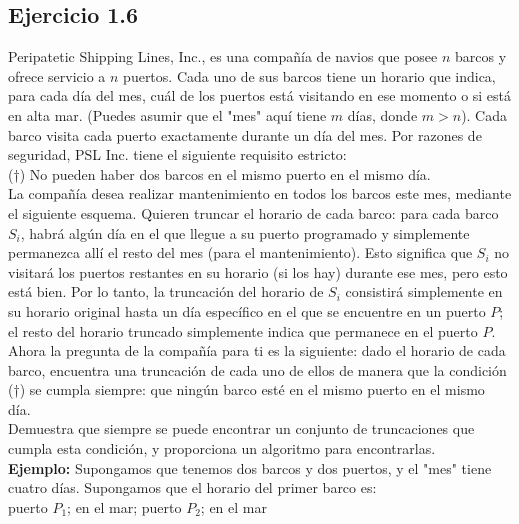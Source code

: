 \documentclass{article}
\begin{document}
\newpage


\subsection{Ejercicio 1.6}

Peripatetic Shipping Lines, Inc., es una compañía de navios que posee $n$ barcos y ofrece servicio a $n$ puertos. Cada uno de sus barcos tiene un horario que indica, para cada día del mes, cuál de los puertos está visitando en ese momento o si está en alta mar. (Puedes asumir que el "mes" aquí tiene $m$ días, donde $m > n$). Cada barco visita cada puerto exactamente durante un día del mes. Por razones de seguridad, PSL Inc. tiene el siguiente requisito estricto:\\

(†) No pueden haber dos barcos en el mismo puerto en el mismo día.\\

La compañía desea realizar mantenimiento en todos los barcos este mes, mediante el siguiente esquema. Quieren truncar el horario de cada barco: para cada barco $S_i$, habrá algún día en el que llegue a su puerto programado y simplemente permanezca allí el resto del mes (para el mantenimiento). Esto significa que $S_i$ no visitará los puertos restantes en su horario (si los hay) durante ese mes, pero esto está bien. Por lo tanto, la truncación del horario de $S_i$ consistirá simplemente en su horario original hasta un día específico en el que se encuentre en un puerto $P$; el resto del horario truncado simplemente indica que permanece en el puerto $P$.\\

Ahora la pregunta de la compañía para ti es la siguiente: dado el horario de cada barco, encuentra una truncación de cada uno de ellos de manera que la condición (†) se cumpla siempre: que ningún barco esté en el mismo puerto en el mismo día.\\

Demuestra que siempre se puede encontrar un conjunto de truncaciones que cumpla esta condición, y proporciona un algoritmo para encontrarlas.\\

\textbf{Ejemplo:} Supongamos que tenemos dos barcos y dos puertos, y el "mes" tiene cuatro días. Supongamos que el horario del primer barco es:\\

    puerto $P_1$; en el mar; puerto $P_2$; en el mar\\
\end{document}
